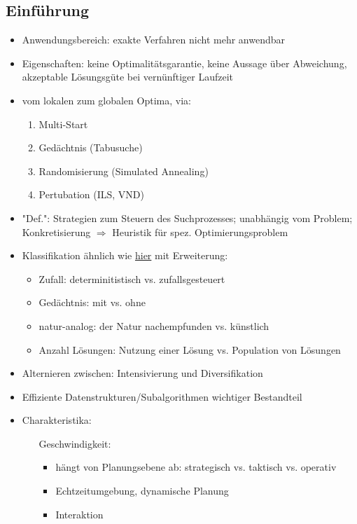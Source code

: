 \documentclass[12pt]{article}
\begin{document}
		\subsection{Einführung}
			\begin{itemize}
				\item Anwendungsbereich: exakte Verfahren nicht mehr anwendbar
				\item Eigenschaften: keine Optimalitätsgarantie, keine Aussage über Abweichung, akzeptable Lösungsgüte bei vernünftiger Laufzeit
				\item vom lokalen zum globalen Optima, via: 
					\begin{enumerate}
						\item Multi-Start
						\item Gedächtnis (Tabusuche) %
						\item Randomisierung (Simulated Annealing)
						\item Pertubation (ILS, VND)
					\end{enumerate}
				\item "Def.": Strategien zum Steuern des Suchprozesses; unabhängig vom Problem; Konkretisierung $\Rightarrow$ Heuristik für spez. Optimierungsproblem
				\item Klassifikation ähnlich wie \hyperref[Heuristik]{hier} mit Erweiterung:
					\begin{itemize}
						\item Zufall: determinitistisch vs. zufallsgesteuert
						\item Gedächtnis: mit vs. ohne
						\item natur-analog: der Natur nachempfunden vs. künstlich
						\item Anzahl Lösungen: Nutzung einer Lösung vs. Population von Lösungen
					\end{itemize}
				\item Alternieren zwischen: Intensivierung und Diversifikation
				\item Effiziente Datenstrukturen/Subalgorithmen wichtiger Bestandteil
				\item Charakteristika:
					\begin{itemize}
						\item[Geschwindigkeit:]
							\begin{itemize}
								\item hängt von Planungsebene ab: strategisch vs. taktisch vs. operativ
								\item Echtzeitumgebung, dynamische Planung
								\item Interaktion

\end{itemize}
\end{itemize}
\end{itemize}
\end{document}
